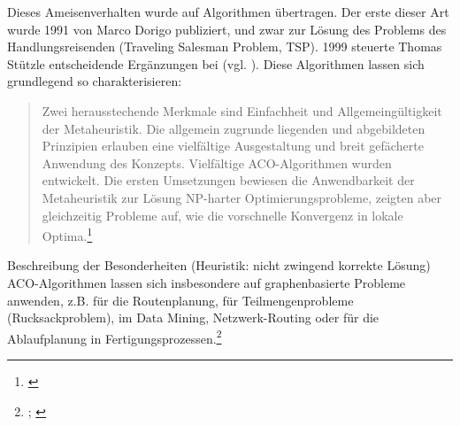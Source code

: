 Dieses Ameisenverhalten wurde auf Algorithmen übertragen. Der erste dieser Art wurde 1991 von Marco Dorigo publiziert, und zwar zur Lösung des Problems des Handlungsreisenden (Traveling Salesman Problem, TSP). 1999 steuerte Thomas Stützle entscheidende Ergänzungen bei (vgl. \cite{ds-ant, wiki-antalg}). Diese Algorithmen lassen sich grundlegend so charakterisieren: \blockquote{Zwei herausstechende Merkmale sind Einfachheit und Allgemeingültigkeit der Metaheuristik. Die allgemein zugrunde liegenden und abgebildeten Prinzipien erlauben eine vielfältige Ausgestaltung und breit gefächerte Anwendung des Konzepts. Vielfältige ACO-Algorithmen wurden entwickelt. Die ersten Umsetzungen bewiesen die Anwendbarkeit der Metaheuristik zur Lösung NP-harter Optimierungsprobleme, zeigten aber gleichzeitig Probleme auf, wie die vorschnelle Konvergenz in lokale Optima.\footnote{\cite[S. 19]{sch-koa}}}


Beschreibung der Besonderheiten (Heuristik: nicht zwingend korrekte Lösung) \\

\noindent
ACO-Algorithmen lassen sich insbesondere auf graphenbasierte Probleme anwenden, z.B. für die Routenplanung, für Teilmengenprobleme (Rucksackproblem), im Data Mining, Netzwerk-Routing oder für die Ablaufplanung in Fertigungsprozessen.\footnote{\cite[Vgl.][S. 15ff.]{sch-koa}; \cite[vgl.][]{wiki-antalg}} \\



\vspace*{1cm}
